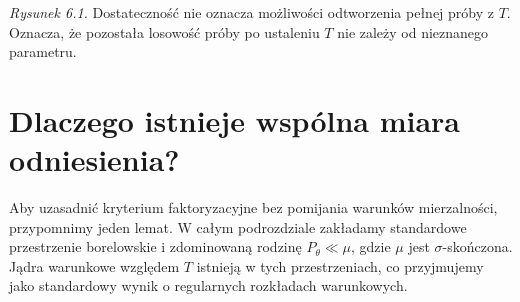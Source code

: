 \documentclass[11pt,a4paper,oneside]{report}
\numberwithin{equation}{chapter}
\theoremstyle{plain}
\theoremstyle{definition}
\theoremstyle{remark}
\begin{document}
\begin{center}
\end{center}
\noindent\emph{Rysunek 6.1.} Dostateczność nie oznacza możliwości
odtworzenia pełnej próby z $T$. Oznacza, że pozostała losowość
próby po ustaleniu $T$ nie zależy od nieznanego parametru.

\section{Dlaczego istnieje wspólna miara odniesienia?}
Aby uzasadnić kryterium faktoryzacyjne bez pomijania warunków
mierzalności, przypomnimy jeden lemat. W całym podrozdziale
zakładamy standardowe przestrzenie borelowskie i zdominowaną
rodzinę $P_\theta\ll\mu$, gdzie $\mu$ jest $\sigma$-skończona.
Jądra warunkowe względem $T$ istnieją w tych przestrzeniach,
co przyjmujemy jako standardowy wynik o regularnych rozkładach
warunkowych.
\end{document}
